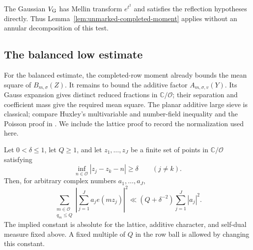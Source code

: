 The Gaussian $V_{\rm G}$ has Mellin transform $e^{t^2}$ and satisfies
the reflection hypotheses directly. Thus
Lemma~\ref{lem:unmarked-completed-moment} applies without an annular
decomposition of this test.

\subsection{The balanced low estimate}

For the balanced estimate, the completed-row moment already bounds the
mean square of $B_{m,\sigma}(Z)$. It remains to bound the additive factor
$A_{m,\sigma,v}(Y)$. Its Gauss expansion gives distinct reduced fractions
in $\mathbb C/\mathcal O$; their separation and coefficient mass give the
required mean square. The planar additive large sieve is classical;
compare Huxley's multivariable and number-field inequality \cite{Huxley}
and the Poisson proof in \cite[Section~3, Theorem~3]{BaierBansal}. We
include the lattice proof to record the normalization used here.

\begin{lemma}
\label{lem:planar-additive-sieve}
Let $0<\delta\le1$, let $Q\ge1$, and let $z_1,\ldots,z_J$ be a finite set
of points in $\mathbb C/\mathcal O$ satisfying
\[
 \inf_{n\in\mathcal O}|z_j-z_k-n|\ge\delta
 \qquad(j\ne k).
\]
Then, for arbitrary complex numbers $a_1,\ldots,a_J$,
\[
 \sum_{\substack{m\in\mathcal O\\q_m\le Q}}
 \left|\sum_{j=1}^J a_j e(mz_j)\right|^2
 \ll (Q+\delta^{-2})\sum_{j=1}^J|a_j|^2.
\]
The implied constant is absolute for the lattice, additive character, and
self-dual measure fixed above.  A fixed multiple of $Q$ in the row ball is
allowed by changing this constant.
\end{lemma}

